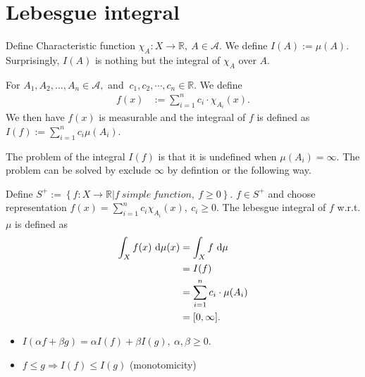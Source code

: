 \documentclass[../../note.tex]{subfiles}
\begin{document}
\section{Lebesgue integral}
\begin{example}
    Define Characteristic function $\chi_A: X \rightarrow \mathbb{R},~A \in \mathcal{A}$. We define $I(A):= \mu(A)$. Surprisingly, $I(A)$ is nothing but the integral of $\chi_A$ over $A$.
\end{example}

\begin{definition}
    \label{simple functions}
    For $A_1, A_2,\dots, A_n \in \mathcal{A},$ and $~c_1,c_2, \cdots, c_n \in \mathbb{R}$. We define
    \begin{align}
        f(x)
        &:= \sum_{i=1}^n c_i \cdot \chi_{A_i}(x).
    \end{align}
    We then have $f(x)$ is measurable and the integraal of $f$ is defined as $I(f):= \sum_{i=1}^n c_i \mu(A_i)$.
\end{definition}
\begin{remark}
    The problem of the integral $I(f)$ is that it is undefined when $\mu(A_i) = \infty$. The problem can be solved by exclude $\infty$ by defintion or the following way.
\end{remark}

\begin{definition}
    Define $S^+:= \left\{f:X\rightarrow\mathbb{R} \vert f~simple~function,~f \geq 0\right\}$. $f \in S^+$ and choose representation $f(x) = \sum_{i=1}^n c_i \chi_{A_i}(x),~c_i \geq 0$. The lebesgue integral of $f$ w.r.t. $\mu$ is defined as
    \begin{align}
        \int_X f(x)~{\rm d}\mu(x) 
        &= \int_X f~{\rm d}\mu \\
        &= I(f) \\
        &= \sum_{i=1}^n c_i \cdot \mu(A_i) \\
        &= [0,\infty].
    \end{align}
\end{definition}

\begin{property}
    \begin{itemize}
        \item $I(\alpha f + \beta g) = \alpha I(f) + \beta I(g),~\alpha,\beta \geq 0$.
        \item $f \leq g \Longrightarrow I(f) \leq I(g)$ (monotomicity)
    \end{itemize}
\end{property}
\end{document}
